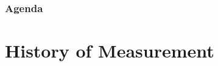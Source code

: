 
\def\PresTitle{History of Measurement}  %
\def\PresSubtitle{Baker College Engineering}         %
\def\PresAuthor{Brad Peirson}               %
\def\PresInstitute{College of Information Technology and Engineering}       %
\def\PresDate{}                             %
\def\PresKeywords{}                         %





\maketitle              %

\begin{frame}
    \frametitle{Agenda}
    \begingroup
        \setlength{\parskip}{0.3em} 
        
        
        \setcounter{tocdepth}{1} %
    \tableofcontents
    \setcounter{tocdepth}{2} %
    \endgroup
\end{frame}

\section{History of Measurement}

